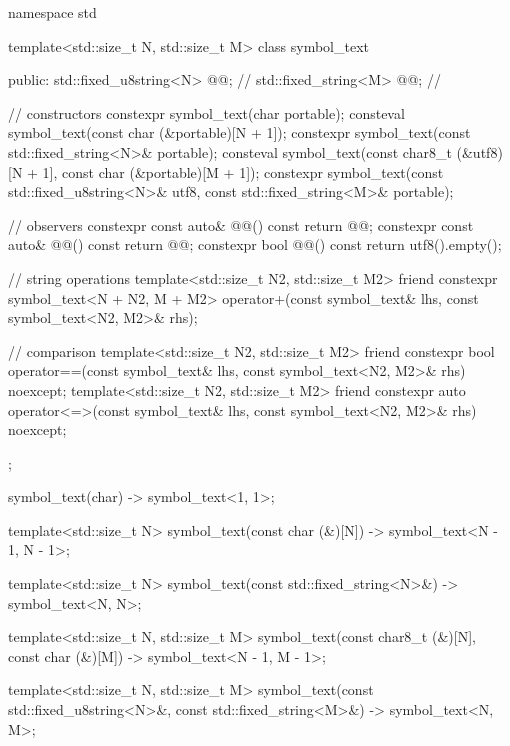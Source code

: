 \begin{codeblock}
namespace std {

template<std::size_t N, std::size_t M>
class symbol_text {
public:
  std::fixed_u8string<N> @@;    // \expos
  std::fixed_string<M> @@;  // \expos

  // constructors
  constexpr symbol_text(char portable);
  consteval symbol_text(const char (&portable)[N + 1]);
  constexpr symbol_text(const std::fixed_string<N>& portable);
  consteval symbol_text(const char8_t (&utf8)[N + 1], const char (&portable)[M + 1]);
  constexpr symbol_text(const std::fixed_u8string<N>& utf8,
                        const std::fixed_string<M>& portable);

  // observers
  constexpr const auto& @@() const { return @@; }
  constexpr const auto& @@() const { return @@; }
  constexpr bool @@() const { return utf8().empty(); }

  // string operations
  template<std::size_t N2, std::size_t M2>
  friend constexpr symbol_text<N + N2, M + M2> operator+(const symbol_text& lhs,
                                                         const symbol_text<N2, M2>& rhs);

  // comparison
  template<std::size_t N2, std::size_t M2>
  friend constexpr bool operator==(const symbol_text& lhs,
                                   const symbol_text<N2, M2>& rhs) noexcept;
  template<std::size_t N2, std::size_t M2>
  friend constexpr auto operator<=>(const symbol_text& lhs,
                                    const symbol_text<N2, M2>& rhs) noexcept;
};

symbol_text(char) -> symbol_text<1, 1>;

template<std::size_t N>
symbol_text(const char (&)[N]) -> symbol_text<N - 1, N - 1>;

template<std::size_t N>
symbol_text(const std::fixed_string<N>&) -> symbol_text<N, N>;

template<std::size_t N, std::size_t M>
symbol_text(const char8_t (&)[N], const char (&)[M]) -> symbol_text<N - 1, M - 1>;

template<std::size_t N, std::size_t M>
symbol_text(const std::fixed_u8string<N>&, const std::fixed_string<M>&) -> symbol_text<N, M>;

}
\end{codeblock}

